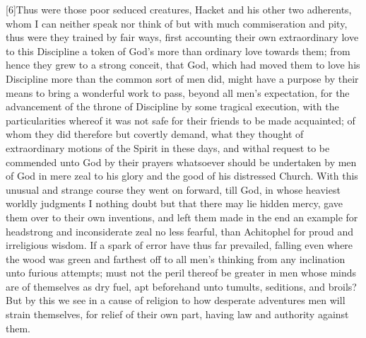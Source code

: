 [6]Thus were those poor seduced creatures, Hacket and his other two adherents, whom I can neither speak nor think of but with much commiseration and pity, thus were they trained by fair ways, first accounting their own extraordinary love to this Discipline a token of God’s more than ordinary love towards them; from hence they grew to a strong conceit, that God, which had moved them to love his Discipline more than the common sort of men did, might have a purpose by their means to bring a wonderful work to pass, beyond all men’s expectation, for the advancement of the throne of Discipline by some tragical execution, with the particularities whereof it was not safe for their friends to be made acquainted; of whom they did therefore but covertly demand, what they thought of extraordinary motions of the Spirit in these days, and withal request to be commended unto God by their prayers whatsoever should be undertaken by men of God in mere zeal to his glory and the good of his distressed Church. With this unusual and strange course they went on forward, till God, in whose heaviest worldly judgments I nothing doubt but that there may lie hidden mercy, gave them over to their own inventions, and left them made in the end an example for headstrong and inconsiderate zeal no less fearful, than Achitophel for proud and irreligious wisdom. If a spark of error have thus far prevailed, falling even where the wood was green and farthest off to all men’s thinking from any inclination unto furious attempts; must not the peril thereof be greater in men whose minds are of themselves as dry fuel, apt beforehand unto tumults, seditions, and broils? But by this we see in a cause of religion to how desperate adventures men will strain themselves, for relief of their own part, having law and authority against them.

